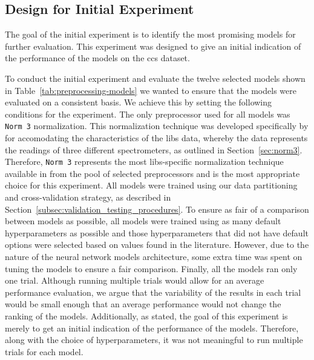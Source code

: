 \subsection{Design for Initial Experiment}\label{sec:initial-experiment}
The goal of the initial experiment is to identify the most promising models for further evaluation.
This experiment was designed to give an initial indication of the performance of the models on the \gls{ccs} dataset.

To conduct the initial experiment and evaluate the twelve selected models shown in Table~\ref{tab:preprocessing-models} we wanted to ensure that the models were evaluated on a consistent basis.
We achieve this by setting the following conditions for the experiment.
The only preprocessor used for all models was \texttt{Norm 3} normalization.
This normalization technique was developed specifically by \citet{cleggRecalibrationMarsScience2017} for accomodating the characteristics of the \gls{libs} data, whereby the data represents the readings of three different spectrometers, as outlined in Section~\ref{sec:norm3}.
Therefore, \texttt{Norm 3} represents the most \gls{libs}-specific normalization technique available in from the pool of selected preprocessors and is the most appropriate choice for this experiment.
All models were trained using our data partitioning and cross-validation strategy, as described in Section~\ref{subsec:validation_testing_procedures}. 
To ensure as fair of a comparison between models as possible, all models were trained using as many default hyperparameters as possible and those hyperparameters that did not have default options were selected based on values found in the literature.
However, due to the nature of the neural network models architecture, some extra time was spent on tuning the models to ensure a fair comparison.
Finally, all the models ran only one trial. 
Although running multiple trials would allow for an average performance evaluation, we argue that the variability of the results in each trial would be small enough that an average performance would not change the ranking of the models. 
Additionally, as stated, the goal of this experiment is merely to get an initial indication of the performance of the models.
Therefore, along with the choice of hyperparameters, it was not meaningful to run multiple trials for each model.